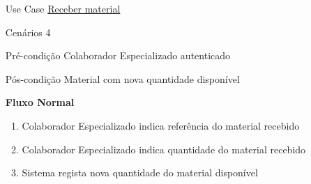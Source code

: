 \documentclass[../relatorio.tex]{subfiles}
\begin{document}
\begin{itemize}
    \item[Use Case] {\underline{Receber material}}
    \item[Cenários] {4}
    \item[Pré-condição] {Colaborador Especializado autenticado}
    \item[Pós-condição] {Material com nova quantidade disponível}
          \begin{flushleft}
              \textbf{Fluxo Normal}
          \end{flushleft}
          \begin{enumerate}
              \item Colaborador Especializado indica referência do material recebido
              \item Colaborador Especializado indica quantidade do material recebido
              \item Sistema regista nova quantidade do material disponível
          \end{enumerate}
\end{itemize}
\end{document}
